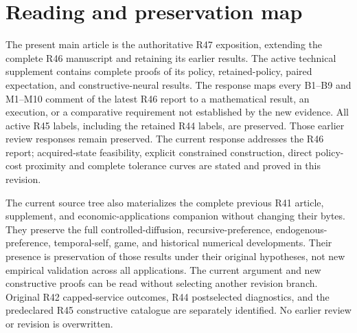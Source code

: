\documentclass[ecta,nameyear,draft]{econsocart}
\begin{document}
\appendix
\section{Reading and preservation map}\label{app:map}
The present main article is the authoritative R47 exposition, extending the complete R46 manuscript and retaining its earlier results. The active technical supplement contains complete proofs of its policy, retained-policy, paired expectation, and constructive-neural results. The response maps every B1--B9 and M1--M10 comment of the latest R46 report to a mathematical result, an execution, or a comparative requirement not established by the new evidence. All active R45 labels, including the retained R44 labels, are preserved. Those earlier review responses remain preserved. The current response addresses the R46 report; acquired-state feasibility, explicit constrained construction, direct policy-cost proximity and complete tolerance curves are stated and proved in this revision.

The current source tree also materializes the complete previous R41 article, supplement, and economic-applications companion without changing their bytes. They preserve the full controlled-diffusion, recursive-preference, endogenous-preference, temporal-self, game, and historical numerical developments. Their presence is preservation of those results under their original hypotheses, not new empirical validation across all applications. The current argument and new constructive proofs can be read without selecting another revision branch. Original R42 capped-service outcomes, R44 postselected diagnostics, and the predeclared R45 constructive catalogue are separately identified. No earlier review or revision is overwritten.



\end{document}
